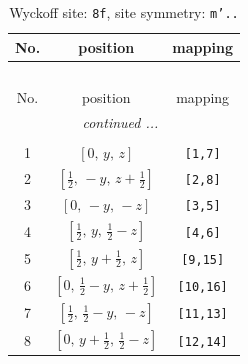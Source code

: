 \documentclass[fleqn,8pt]{jsarticle}
\begin{document}
\begin{longtable}{ccc}
\caption{Wyckoff site: {\tt 8f}, site symmetry: {\tt m'..}}
 \\
 \hline \hline
No. & position & mapping \\ \hline \endfirsthead

\multicolumn{2}{l}{\tablename\ \thetable{}} \\
 \hline \hline
No. & position & mapping \\ \hline \endhead

 \hline \hline
\multicolumn{2}{r}{\footnotesize\it continued ...} \\ \endfoot

 \hline \hline
\multicolumn{2}{r}{} \\ \endlastfoot

1 & $\left[ 0,\, y,\, z \right]$ & {\tt [1,7]} \\ \hline
2 & $\left[ \frac{1}{2},\, - y,\, z + \frac{1}{2} \right]$ & {\tt [2,8]} \\ \hline
3 & $\left[ 0,\, - y,\, - z \right]$ & {\tt [3,5]} \\ \hline
4 & $\left[ \frac{1}{2},\, y,\, \frac{1}{2} - z \right]$ & {\tt [4,6]} \\ \hline
5 & $\left[ \frac{1}{2},\, y + \frac{1}{2},\, z \right]$ & {\tt [9,15]} \\ \hline
6 & $\left[ 0,\, \frac{1}{2} - y,\, z + \frac{1}{2} \right]$ & {\tt [10,16]} \\ \hline
7 & $\left[ \frac{1}{2},\, \frac{1}{2} - y,\, - z \right]$ & {\tt [11,13]} \\ \hline
8 & $\left[ 0,\, y + \frac{1}{2},\, \frac{1}{2} - z \right]$ & {\tt [12,14]} \\
\end{longtable}
\renewcommand{\arraystretch}{1.2}
\end{document}
